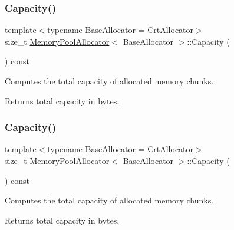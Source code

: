 \subsubsection{\texorpdfstring{Capacity()}{Capacity()}\hspace{0.1cm}{\footnotesize\ttfamily [1/2]}}
{\footnotesize\ttfamily template$<$typename Base\+Allocator = Crt\+Allocator$>$ \\
size\+\_\+t \hyperlink{classMemoryPoolAllocator}{Memory\+Pool\+Allocator}$<$ Base\+Allocator $>$\+::Capacity (\begin{DoxyParamCaption}{ }\end{DoxyParamCaption}) const\hspace{0.3cm}{\ttfamily [inline]}}



Computes the total capacity of allocated memory chunks. 

\begin{DoxyReturn}{Returns}
total capacity in bytes. 
\end{DoxyReturn}
\mbox{\label{classMemoryPoolAllocator_a5672e0833fda2e71ce987911397489ed}} 
\subsubsection{\texorpdfstring{Capacity()}{Capacity()}\hspace{0.1cm}{\footnotesize\ttfamily [2/2]}}
{\footnotesize\ttfamily template$<$typename Base\+Allocator = Crt\+Allocator$>$ \\
size\+\_\+t \hyperlink{classMemoryPoolAllocator}{Memory\+Pool\+Allocator}$<$ Base\+Allocator $>$\+::Capacity (\begin{DoxyParamCaption}{ }\end{DoxyParamCaption}) const\hspace{0.3cm}{\ttfamily [inline]}}



Computes the total capacity of allocated memory chunks. 

\begin{DoxyReturn}{Returns}
total capacity in bytes. 
\end{DoxyReturn}
\mbox{\label{classMemoryPoolAllocator_ae7fcf0341c13e899cf488bc7c8949956}} 
